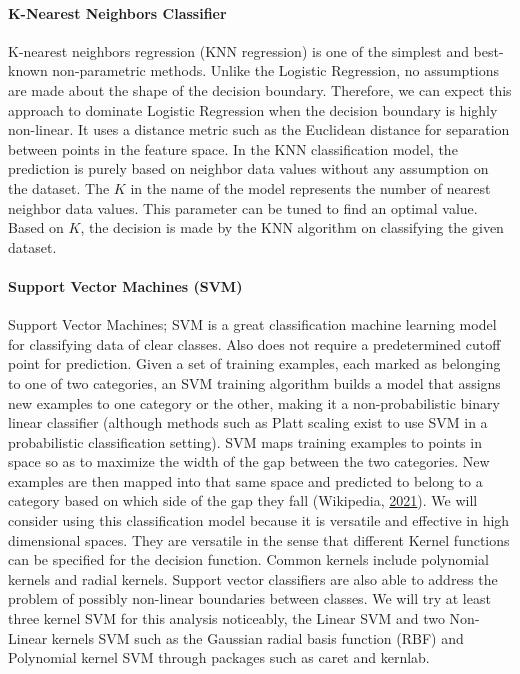 \documentclass[
  10pt,
]{article}
\begin{document}
\hypertarget{k-nearest-neighbors-classifier}{%
\paragraph{K-Nearest Neighbors Classifier}\label{k-nearest-neighbors-classifier}}

K-nearest neighbors regression (KNN regression) is one of the simplest and best-known
non-parametric methods. Unlike the Logistic Regression, no assumptions are made about the shape of the decision boundary. Therefore, we can expect this approach to dominate Logistic Regression when the decision boundary is highly non-linear. It uses a distance metric such as the Euclidean distance for separation between points in the feature space. In the KNN classification model, the prediction is purely based on neighbor data values without any assumption on the dataset. The \(K\) in the name of the model represents the number of nearest neighbor data values. This parameter can be tuned to find an optimal value. Based on \(K\), the decision is made by the KNN algorithm on classifying the given dataset.

\hypertarget{support-vector-machines-svm}{%
\paragraph{\texorpdfstring{Support Vector Machines (SVM) }{Support Vector Machines (SVM)  }}\label{support-vector-machines-svm}}

Support Vector Machines; SVM is a great classification machine learning model for classifying data of clear classes. Also does not require a predetermined cutoff point for prediction. Given a set of training examples, each marked as belonging to one of two categories, an SVM training algorithm builds a model that assigns new examples to one category or the other, making it a non-probabilistic binary linear classifier (although methods such as Platt scaling exist to use SVM in a probabilistic classification setting). SVM maps training examples to points in space so as to maximize the width of the gap between the two categories. New examples are then mapped into that same space and predicted to belong to a category based on which side of the gap they fall (Wikipedia, \protect\hyperlink{ref-wikipedia}{2021}).
We will consider using this classification model because it is versatile and effective in high dimensional spaces. They are versatile in the sense that different Kernel functions can be specified for the decision function. Common kernels include polynomial kernels and radial kernels. Support vector classifiers are also able to address the problem of possibly non-linear boundaries between classes. We will try at least three kernel SVM for this analysis noticeably, the Linear SVM and two Non-Linear kernels SVM such as the Gaussian radial basis function (RBF) and Polynomial kernel SVM through packages such as caret and kernlab.
\end{document}

